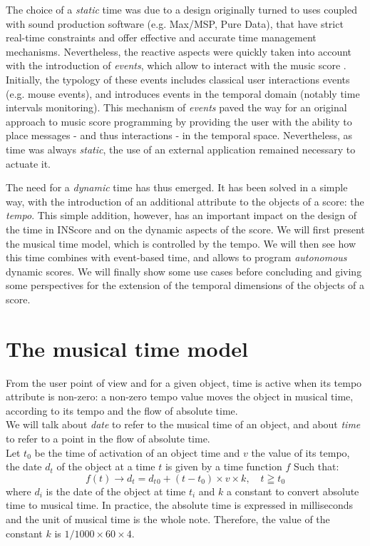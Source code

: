 \documentclass{article}
\begin{document}
The choice of a \emph{static} time was due to a design originally turned to uses coupled with sound production software (e.g. Max/MSP, Pure Data), that have strict real-time constraints and offer effective and accurate time management mechanisms. Nevertheless, the reactive aspects were quickly taken into account with the introduction of \textit{events}, which allow to interact with the music score \cite{fober13a}. Initially, the typology of these events includes classical user interactions events (e.g. mouse events), and introduces events in the temporal domain (notably time intervals monitoring). This mechanism of \textit{events} paved the way for an original approach to music score programming by providing the user with the ability to place messages - and thus interactions - in the temporal space. Nevertheless, as time was always \emph{static}, the use of an external application remained necessary to actuate it.

The need for a \emph{dynamic} time has thus emerged. It has been solved in a simple way, with the introduction of an additional attribute to the objects of a score: the \emph{tempo}. This simple addition, however, has an important impact on the design of the time in INScore and on the dynamic aspects of the score. We will first present the musical time model, which is controlled by the tempo. We will then see how this time combines with event-based time, and allows to program \emph{autonomous} dynamic scores. We will finally show some use cases before concluding and giving some perspectives for the extension of the temporal dimensions of the objects of a score.


\section{The musical time model}\label{mustime}

From the user point of view and for a given object, time is active when its tempo attribute is non-zero: a non-zero tempo value moves the object in musical time, according to its tempo and the flow of absolute time. \\
We will talk about \emph{date} to refer to the musical time of an object, and about \emph{time} to refer to a point in the flow of absolute time. \\

Let $t_0$ be the time of activation of an object time and $v$ the value of its tempo, the date $d_t$ of the object at a time $t$ is given by a time function $f$ Such that:
\begin{equation}
	 f(t) \to d_t = d_t{_0} + (t - t_0) \times v \times k , \quad t \geqq t_0
\label{timeeq}
\end{equation}
where $d_i$ is the date of the object at time $t_i$ and $k$ a constant to convert absolute time to musical time. In practice, the absolute time is expressed in milliseconds and the unit of musical time is the whole note. Therefore, the value of the constant $k$ is $1/1000 \times 60 \times 4$.
\end{document}
